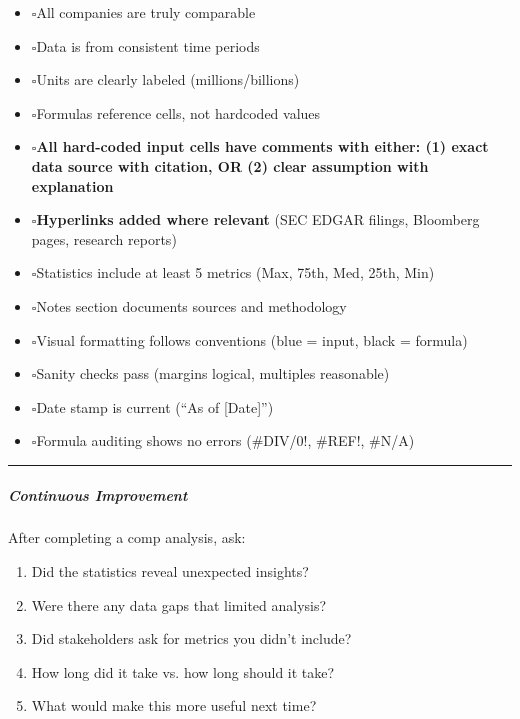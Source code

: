 \documentclass[11pt]{article}
\newcommand{\UncheckedBox}{$\square$}
\begin{document}
\begin{itemize}[leftmargin=*,itemsep=2pt,topsep=2pt]
\item {} \UncheckedBox All companies are truly comparable
\item {} \UncheckedBox Data is from consistent time periods
\item {} \UncheckedBox Units are clearly labeled (millions/billions)
\item {} \UncheckedBox Formulas reference cells, not hardcoded values
\item {} \UncheckedBox \textbf{All hard-coded input cells have comments with either: (1) exact data source with citation, OR (2) clear assumption with explanation}
\item {} \UncheckedBox \textbf{Hyperlinks added where relevant} (SEC EDGAR filings, Bloomberg pages, research reports)
\item {} \UncheckedBox Statistics include at least 5 metrics (Max, 75th, Med, 25th, Min)
\item {} \UncheckedBox Notes section documents sources and methodology
\item {} \UncheckedBox Visual formatting follows conventions (blue = input, black = formula)
\item {} \UncheckedBox Sanity checks pass (margins logical, multiples reasonable)
\item {} \UncheckedBox Date stamp is current (``As of [Date]'')
\item {} \UncheckedBox Formula auditing shows no errors (\#DIV/0!, \#REF!, \#N/A)
\end{itemize}

\vspace{0.5em}\hrule\vspace{0.5em}

\subparagraph{Continuous Improvement}\mbox{}\par

After completing a comp analysis, ask:

\begin{enumerate}[leftmargin=*,itemsep=2pt,topsep=2pt]
\item {} Did the statistics reveal unexpected insights?
\item {} Were there any data gaps that limited analysis?
\item {} Did stakeholders ask for metrics you didn't include?
\item {} How long did it take vs. how long should it take?
\item {} What would make this more useful next time?
\end{enumerate}
\end{document}
